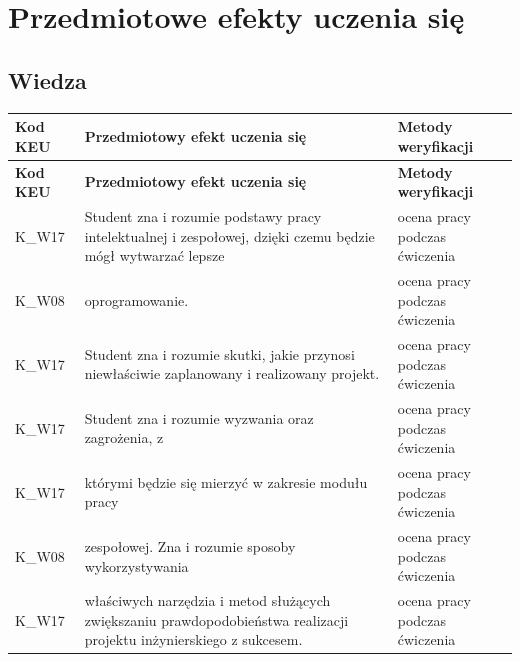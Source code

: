 \documentclass[12pt, a4paper]{article}
\newcommand{\thdrule}{\noalign{\global\setlength{\extrarowheight}{0pt}}}
\newcommand{\thdend}{\noalign{\global\setlength{\extrarowheight}{3pt}}}
\begin{document}
\section{Przedmiotowe efekty uczenia się}

\subsection*{Wiedza}
{\scriptsize
\begin{longtable}{m{1.6cm}m{9.0cm}m{4.2cm}}
\thdrule\toprule
\rowcolor{pjatkRed} {\color{white}\footnotesize\textbf{\vphantom{Ag}Kod KEU}} & {\color{white}\footnotesize\textbf{\vphantom{Ag}Przedmiotowy efekt uczenia się}} & {\color{white}\footnotesize\textbf{\vphantom{Ag}Metody weryfikacji}} \\
\midrule\thdend
\endfirsthead
\thdrule\toprule
\rowcolor{pjatkRed} {\color{white}\footnotesize\textbf{\vphantom{Ag}Kod KEU}} & {\color{white}\footnotesize\textbf{\vphantom{Ag}Przedmiotowy efekt uczenia się}} & {\color{white}\footnotesize\textbf{\vphantom{Ag}Metody weryfikacji}} \\
\midrule\thdend
\endhead
  \rowcolor{tableRowLight} K\_W17 & Student zna i rozumie podstawy pracy intelektualnej i zespołowej, dzięki czemu będzie mógł wytwarzać lepsze & ocena pracy podczas ćwiczenia \\
  \rowcolor{tableRowAlt} K\_W08 & oprogramowanie. & ocena pracy podczas ćwiczenia \\
  \rowcolor{tableRowLight} K\_W17 & Student zna i rozumie skutki, jakie przynosi niewłaściwie zaplanowany i realizowany projekt. & ocena pracy podczas ćwiczenia \\
  \rowcolor{tableRowAlt} K\_W17 & Student zna i rozumie wyzwania oraz zagrożenia, z & ocena pracy podczas ćwiczenia \\
  \rowcolor{tableRowLight} K\_W17 & którymi będzie się mierzyć w zakresie modułu pracy & ocena pracy podczas ćwiczenia \\
  \rowcolor{tableRowAlt} K\_W08 & zespołowej. Zna i rozumie sposoby wykorzystywania & ocena pracy podczas ćwiczenia \\
  \rowcolor{tableRowLight} K\_W17 & właściwych narzędzia i metod służących zwiększaniu prawdopodobieństwa realizacji projektu inżynierskiego z sukcesem. & ocena pracy podczas ćwiczenia \\
\bottomrule
\end{longtable}}
\end{document}

